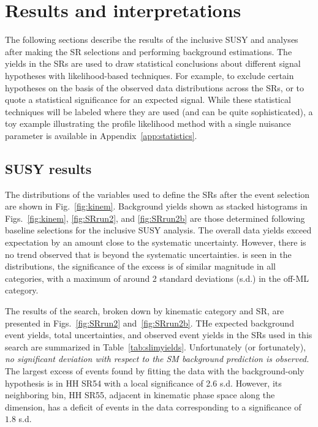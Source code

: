 \chapter{Results and interpretations}
\label{chap:results}

The following sections describe the results of the inclusive SUSY and \smft
analyses after making the SR selections and performing 
background estimations. The yields in the SRs are used to draw statistical
conclusions about different signal hypotheses with likelihood-based
techniques. For example, to exclude certain
hypotheses on the basis of the observed data distributions across the SRs,
or to quote a statistical significance for an expected signal.
While these statistical techniques will be labeled where they are used
(and can be quite sophisticated),
a toy example illustrating the profile likelihood method with a single nuisance
parameter is available in Appendix~\ref{app:statistics}.

\section{SUSY results}
\label{sec:ssresults}

The distributions of the variables used to define the SRs after the event selection are
shown in Fig.~\ref{fig:kinem}.
Background yields shown as stacked histograms in Figs.~\ref{fig:kinem}, \ref{fig:SRrun2}, and \ref{fig:SRrun2b} are
those determined following baseline selections for the inclusive SUSY analysis.
The overall data yields exceed expectation by an amount close to the systematic uncertainty.
However, there is no trend observed that is beyond the systematic uncertainties.
is seen in the distributions,
the significance of the excess is of similar magnitude in all categories, with a maximum of around 2 standard deviations (s.d.) in the off-\PZ ML category. 

The results of the search, broken down by kinematic category and SR,
are presented in Figs.~\ref{fig:SRrun2} and~\ref{fig:SRrun2b}.
THe expected background event yields, total uncertainties, and observed event yields in the SRs used in this search
are summarized in Table~\ref{tab:slimyields}.
Unfortunately (or fortunately), {\it no significant deviation with respect to the SM background prediction is observed.}
The largest excess of events found by fitting the data with the background-only
hypothesis is in HH SR54 with a local significance of 2.6 s.d.
However, its neighboring bin, HH SR55, adjacent in kinematic phase space along the \HT dimension, has a
deficit of events in the data corresponding to a
significance of $1.8$ s.d.

